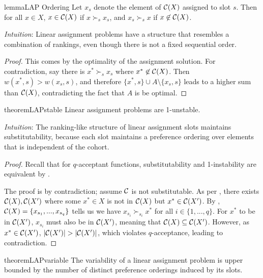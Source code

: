 \begin{restatable}{lemma}{LAP Ordering}
\label{lem:lap-ordering}
Let $x_{s}$ denote the element of $\mathcal{C}(X)$ assigned to slot $s$. Then for all $x \in X$, $x \in \mathcal{C}(X)$ if $x \succ_s x_s$, and $x_s \succ_s x$ if $x \not\in \mathcal{C}(X)$.
\end{restatable}

\textit{Intuition}: Linear assignment problems have a structure that resembles a combination of rankings, even though there is not a fixed sequential order.

\begin{proof}
This comes by the optimality of the assignment solution. For contradiction, say there is $x^* \succ_s x_s$ where $x^* \not\in \mathcal{C}(X)$. Then $w(x^*, s) > w(x_s, s)$, and therefore $\{x^*, s\} \cup A \setminus \{x_s, s\}$ leads to a higher sum than $\mathcal{C}(X)$, contradicting the fact that $A$ is be optimal.
\end{proof}

\begin{restatable}{theorem}{LAPstable}
\label{thm:lap-unstable}
Linear assignment problems are 1-unstable.
\end{restatable}

\textit{Intuition}: The ranking-like structure of linear assignment slots maintains substitutability, because each slot maintains a  preference ordering over elements that is independent of the cohort.

\begin{proof}
Recall that for $q$-acceptant functions, substitutability and 1-instability are equivalent by .

The proof is by contradiction; assume $\mathcal{C}$ is not substitutable. As per , there exists $\mathcal{C}(X), \mathcal{C}(X')$ where some $x^* \in X$ is not in $\mathcal{C}(X)$ but $x^* \in \mathcal{C}(X')$.
By , $\mathcal{C}(X) = \{x_{s_1}, ..., x_{s_q}\}$ tells us we have $x_{s_i} \succ_{s_i} x^*$ for all $i \in \{1, ..., q\}$. For $x^*$ to be in $\mathcal{C}(X')$, $x_{s_i}$ must also be in $\mathcal{C}(X')$, meaning that $\mathcal{C}(X) \subseteq \mathcal{C}(X')$. However, as $x^* \in \mathcal{C}(X')$, $|\mathcal{C}(X')| > |\mathcal{C}(X')|$, which violates $q$-acceptance, leading to contradiction.
\end{proof}

\begin{restatable}{theorem}{LAPvariable}
\label{thm:lap-variability}
The variability of a linear assignment problem is upper bounded by the number of distinct preference orderings induced by its slots.
\end{restatable}

